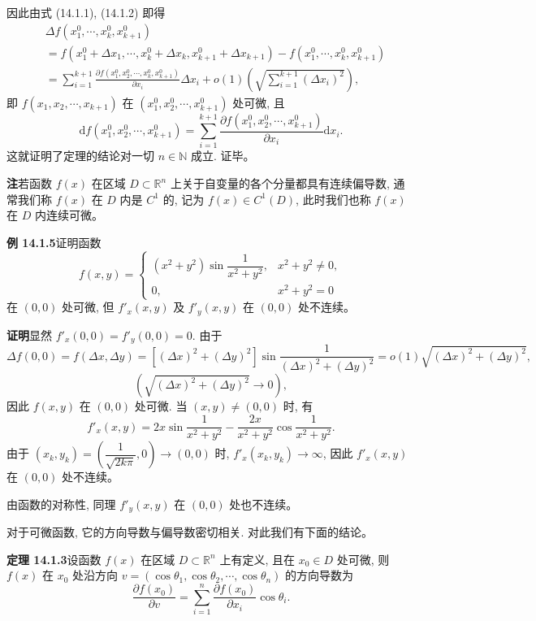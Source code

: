 \documentclass[UTF8, 12pt, fontset=fandol, oneside]{ctexart}
\begin{document}
因此由式 (14.1.1), (14.1.2) 即得
\[
\begin{aligned}
&\Delta f(x_1^0,\cdots,x_k^0,x_{k+1}^0)\\
&=
  f(x_1^0+\Delta x_1,\cdots,x_k^0+\Delta x_k,x_{k+1}^0+\Delta x_{k+1})
  -f(x_1^0,\cdots,x_k^0,x_{k+1}^0)\\
&=\sum_{i=1}^{k+1}
  \frac{\partial f(x_1^0,x_2^0,\cdots,x_k^0,x_{k+1}^0)}{\partial x_i}\Delta x_i
  +o(1)\left(\sqrt{\sum_{i=1}^{k+1}(\Delta x_i)^2}\right),
\end{aligned}
\]
即 $f(x_1,x_2,\cdots,x_{k+1})$ 在 $(x_1^0,x_2^0,\cdots,x_{k+1}^0)$ 处可微, 且
\[
  \mathrm df(x_1^0,x_2^0,\cdots,x_{k+1}^0)
  =\sum_{i=1}^{k+1}
  \frac{\partial f(x_1^0,x_2^0,\cdots,x_{k+1}^0)}{\partial x_i}\mathrm dx_i.
\]
这就证明了定理的结论对一切 $n\in\mathbb N$ 成立. 证毕。

\noindent\textbf{注}\quad 若函数 $f(x)$ 在区域 $D\subset\mathbb R^n$ 上关于自变量的各个分量都具有连续偏导数, 通常我们称 $f(x)$ 在 $D$ 内是 $C^1$ 的, 记为 $f(x)\in C^1(D)$, 此时我们也称 $f(x)$ 在 $D$ 内连续可微。

\noindent\textbf{例 14.1.5}\quad 证明函数
\[
  f(x,y)=
  \begin{cases}
    (x^2+y^2)\sin\dfrac1{x^2+y^2}, & x^2+y^2\ne0,\\
    0, & x^2+y^2=0
  \end{cases}
\]
在 $(0,0)$ 处可微, 但 $f'_x(x,y)$ 及 $f'_y(x,y)$ 在 $(0,0)$ 处不连续。

\noindent\textbf{证明}\quad 显然 $f'_x(0,0)=f'_y(0,0)=0$. 由于
\[
  \Delta f(0,0)=f(\Delta x,\Delta y)
  =[(\Delta x)^2+(\Delta y)^2]\sin\frac1{(\Delta x)^2+(\Delta y)^2}
  =o(1)\sqrt{(\Delta x)^2+(\Delta y)^2},
\]
\[
  \left(\sqrt{(\Delta x)^2+(\Delta y)^2}\to0\right),
\]
因此 $f(x,y)$ 在 $(0,0)$ 处可微. 当 $(x,y)\ne(0,0)$ 时, 有
\[
  f'_x(x,y)=2x\sin\frac1{x^2+y^2}-\frac{2x}{x^2+y^2}\cos\frac1{x^2+y^2}.
\]
由于 $(x_k,y_k)=\left(\dfrac1{\sqrt{2k\pi}},0\right)\to(0,0)$ 时, $f'_x(x_k,y_k)\to\infty$, 因此 $f'_x(x,y)$ 在 $(0,0)$ 处不连续。

由函数的对称性, 同理 $f'_y(x,y)$ 在 $(0,0)$ 处也不连续。

对于可微函数, 它的方向导数与偏导数密切相关. 对此我们有下面的结论。

\noindent\textbf{定理 14.1.3}\quad 设函数 $f(x)$ 在区域 $D\subset\mathbb R^n$ 上有定义, 且在 $x_0\in D$ 处可微, 则 $f(x)$ 在 $x_0$ 处沿方向 $v=(\cos\theta_1,\cos\theta_2,\cdots,\cos\theta_n)$ 的方向导数为
\[
  \frac{\partial f(x_0)}{\partial v}
  =\sum_{i=1}^n\frac{\partial f(x_0)}{\partial x_i}\cos\theta_i.
\]
\end{document}
